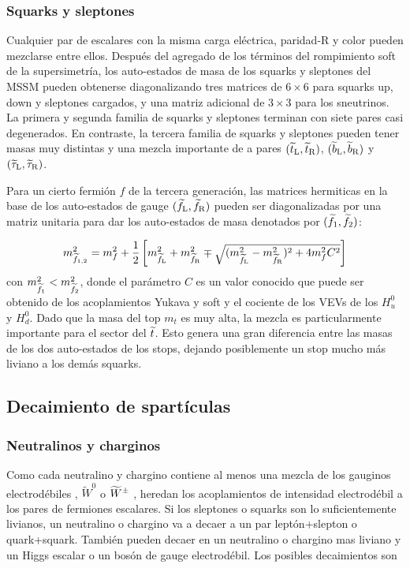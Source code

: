 \subsubsection{Squarks y sleptones}

Cualquier par de escalares con la misma carga eléctrica, paridad-R y color
pueden mezclarse entre ellos. Después del agregado de los términos del
rompimiento soft de la supersimetría, los auto-estados de masa de los squarks y
sleptones del MSSM pueden obtenerse diagonalizando tres matrices de $6\times6$
para squarks up, down y sleptones cargados, y una matriz adicional de $3\times
3$ para los sneutrinos. La primera y segunda familia de squarks y sleptones
terminan con siete pares casi degenerados. En contraste, la tercera familia de
squarks y sleptones pueden tener masas muy distintas y una mezcla importante de
a pares $(\widetilde{t}_{\mathrm{L}}, \widetilde{t}_{\mathrm{R}})$, $(\widetilde{b}_{\mathrm{L}}, \widetilde{b}_{\mathrm{R}})$ y $(\widetilde{\tau}_{\mathrm{L}}, \widetilde{\tau}_{\mathrm{R}})$.

Para un cierto fermión $f$ de la tercera generación, las matrices hermiticas en
la base de los auto-estados de gauge $(\widetilde{f}_{\mathrm{L}}, \widetilde{f}_{\mathrm{R}})$ pueden ser
diagonalizadas por una matriz unitaria para dar los auto-estados de masa
denotados por $(\widetilde{f}_{\mathrm{1}}, \widetilde{f}_{\mathrm{2}})$:

\begin{equation}
  m_{\widetilde{f}_{\mathrm{1,2}}}^2 = m^2_f + \frac{1}{2} \left[
    m_{\widetilde{f}_{\mathrm{L}}}^2 + m_{\widetilde{f}_{\mathrm{R}}}^2 \mp \sqrt{(m_{\widetilde{f}_{\mathrm{L}}}^2 -
      m_{\widetilde{f}_{\mathrm{R}}}^2)^2 + 4 m_f^2 C^2} \right]
\end{equation}
%
con $m_{\widetilde{f}_{\mathrm{1}}}^2 < m_{\widetilde{f}_{\mathrm{2}}}^2$, donde el parámetro $C$ es un
valor conocido que puede ser obtenido de los acoplamientos Yukava y soft y el
cociente de los VEVs de los $H_u^0$ y $H_d^0$. Dado que la masa del top $m_t$ es
muy alta, la mezcla es particularmente importante para el sector del $\widetilde{t}$.
Esto genera una gran diferencia entre las masas de los dos auto-estados de los
stops, dejando posiblemente un stop mucho más liviano a los demás squarks.


\subsection{Decaimiento de spartículas}

\subsubsection{Neutralinos y charginos}

Como cada neutralino y chargino contiene al menos una mezcla de los gauginos
electrodébiles {\bino}, $\tilde W^0$ o $\widetilde{W}^{\pm}$ , heredan los
acoplamientos de intensidad electrodébil a los pares de fermiones escalares. Si
los sleptones o squarks son lo suficientemente livianos, un neutralino o
chargino va a decaer a un par leptón+slepton o quark+squark. También pueden
decaer en un neutralino o chargino mas liviano y un Higgs escalar o un bosón
de gauge electrodébil. Los posibles decaimientos son

